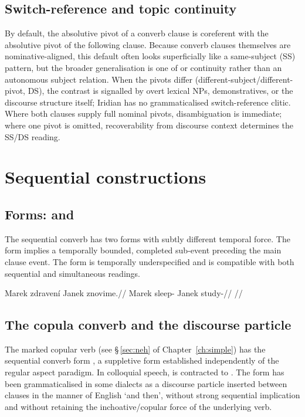 \subsection{Switch-reference and topic continuity}\label{sec:switch-reference}

By default, the absolutive pivot of a converb clause is coreferent with the
absolutive pivot of the following clause. Because converb clauses themselves are
nominative-aligned, this default often looks superficially like a same-subject
(SS) pattern, but the broader generalisation is one of  or
 continuity rather than an autonomous subject relation. When
the pivots differ (different-subject/different-pivot, DS), the contrast is
signalled by overt lexical NPs, demonstratives, or the discourse structure
itself; Iridian has no grammaticalised switch-reference clitic. Where both
clauses supply full nominal pivots, disambiguation is immediate; where one
pivot is omitted, recoverability from discourse context determines the SS/DS
reading.

\section{Sequential constructions}\label{sec:sequential}

\subsection{Forms:  and }

The sequential converb has two forms with subtly different temporal force. The  form implies a temporally bounded, completed sub-event preceding the main clause event. The  form is temporally underspecified and is compatible with both sequential and simultaneous readings.

\pex
\a
\begingl
\gla Marek zdravení Janek znovime.//
\glb Marek sleep-\Seq{} Janek study-\Prog{}//
\glft {} //
\endgl
\xe

\subsection{The copula converb and the discourse particle }\label{sec:seq-copula}

The marked copular verb  (see §\,\ref{sec:neh} of Chapter~\ref{ch:simple}) has the sequential converb form , a suppletive form established independently of the regular aspect paradigm. In colloquial speech,  is contracted to . The form  has been grammaticalised in some dialects as a discourse particle inserted between clauses in the manner of English `and then', without strong sequential implication and without retaining the inchoative/copular force of the underlying verb.

